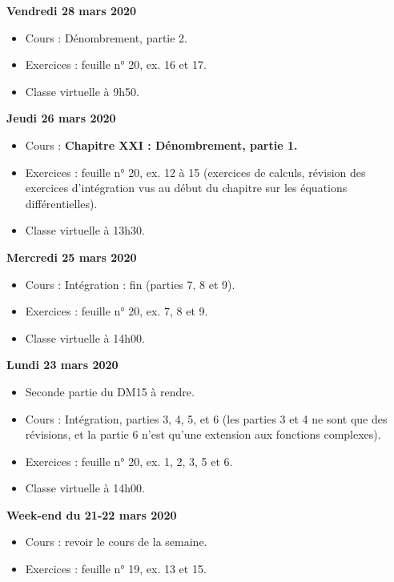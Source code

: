 \documentclass[12pt,a4paper]{article}
\begin{document}
\noindent\textbf{\bf Vendredi 28 mars 2020}
\begin{itemize}
\item Cours : Dénombrement, partie 2.
\item Exercices : feuille n° 20, ex. 16 et 17.
\item Classe virtuelle à 9h50.\vspace{.4cm}
\end{itemize}

\noindent\textbf{Jeudi 26 mars 2020}
\begin{itemize}
\item Cours : \bf Chapitre XXI \rm : Dénombrement, partie 1.
\item Exercices : feuille n° 20, ex. 12 à 15 (exercices de calculs, révision des exercices d'intégration vus au début du chapitre sur les équations différentielles).
\item Classe virtuelle à 13h30.\vspace{.4cm}
\end{itemize}

\noindent\textbf{Mercredi 25 mars 2020}
\begin{itemize}
\item Cours : Intégration : fin (parties 7, 8 et 9).
\item Exercices : feuille n° 20, ex. 7, 8 et 9.
\item Classe virtuelle à 14h00.\vspace{.4cm}
\end{itemize}

\noindent\textbf{\bf Lundi 23 mars 2020}
\begin{itemize}
\item Seconde partie du DM15 à rendre.
\item Cours : Intégration, parties 3, 4, 5, et 6 (les parties 3 et 4 ne sont que des révisions, et la partie 6 n'est qu'une extension aux fonctions complexes).
\item Exercices : feuille n° 20, ex. 1, 2, 3, 5 et 6.
\item Classe virtuelle à 14h00.\vspace{.4cm}
\end{itemize}

\noindent\textbf{Week-end du 21-22 mars 2020}
\begin{itemize}
\item Cours : revoir le cours de la semaine.
\item Exercices : feuille n° 19, ex. 13 et 15.\vspace{.4cm}
\end{itemize}
\end{document}

